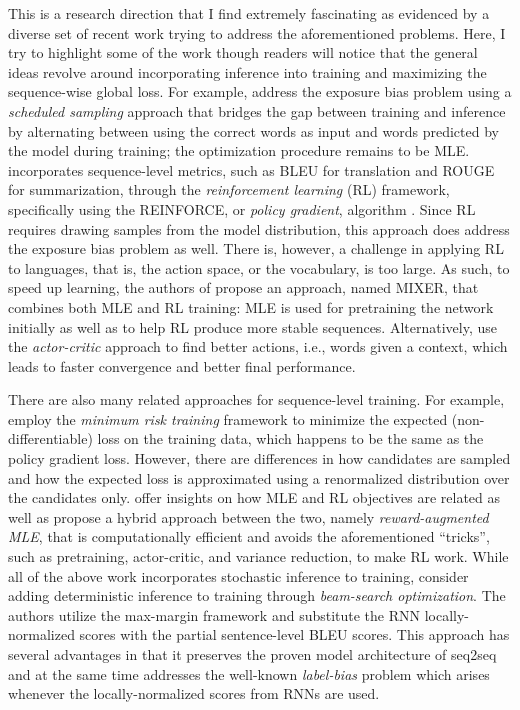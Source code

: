 This is a research direction that I find extremely fascinating as evidenced by a diverse set of recent work trying to address the aforementioned problems. Here, I try to  highlight some of the work though readers will notice that the general ideas revolve around incorporating inference into training and maximizing the sequence-wise global loss. For example,  address the exposure bias problem using a {\it scheduled sampling} approach that bridges the gap between training and inference by alternating between using the correct words as input and words predicted by the model during training; the optimization procedure remains to be MLE.  incorporates sequence-level metrics, such as BLEU for translation and ROUGE for summarization, through the {\it reinforcement learning} (RL) framework, specifically using the REINFORCE, or {\it policy gradient}, algorithm \cite{reinforce}. Since RL requires drawing samples from the model distribution, this approach does address the exposure bias problem as well. There is, however, a challenge in applying RL to languages, that is, the action space, or the vocabulary, is too large. As such, to speed up learning, the authors of \cite{ranzato16} propose an approach, named MIXER, that combines both MLE and RL training: MLE is used for pretraining the network initially as well as to help RL produce more stable sequences. Alternatively,  use the {\it actor-critic} approach to find better actions, i.e., words given a context, which leads to faster convergence and better final performance.

There are also many related approaches for sequence-level training. For example, 
 employ the {\it minimum risk training} framework to minimize the expected (non-differentiable) loss on the training data, which happens to be the same as the policy gradient loss. However, there are differences in how candidates are sampled and how the expected loss is approximated using a renormalized distribution over the candidates only. 
 offer insights on how MLE and RL objectives are related as well as propose a hybrid approach between the two, namely {\it 
reward-augmented MLE}, that is computationally efficient and avoids the aforementioned ``tricks'', such as pretraining, actor-critic, and variance reduction, to make RL work.
While all of the above work incorporates stochastic inference to training,  consider adding deterministic inference to training through {\it beam-search optimization}.
The authors utilize the max-margin framework and substitute the RNN locally-normalized scores with the partial sentence-level BLEU scores. This approach has several advantages in that it preserves the proven model architecture of seq2seq and at the same time addresses
the well-known {\it label-bias} problem \cite{lafferty01} which arises whenever the locally-normalized scores from RNNs are used.

